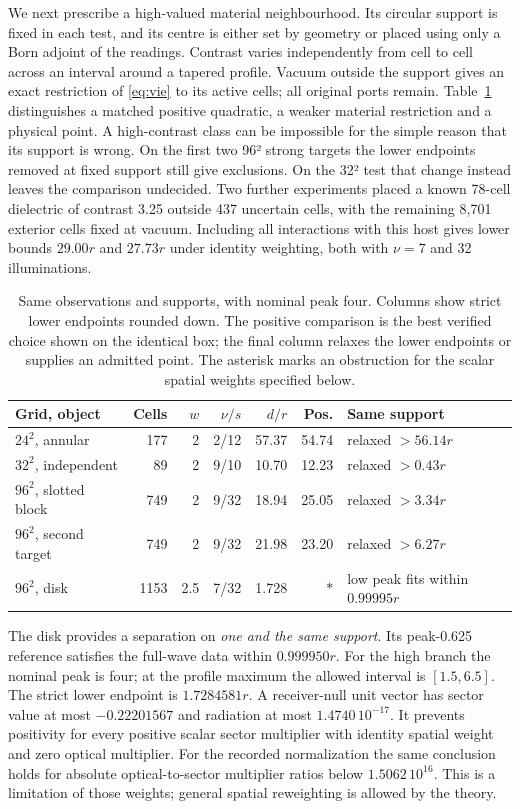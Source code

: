 We next prescribe a high-valued material neighbourhood. Its circular support is fixed in each test, and its centre is either set by geometry or placed using only a Born adjoint of the readings. Contrast varies independently from cell to cell across an interval around a tapered profile. Vacuum outside the support gives an exact restriction of \eqref{eq:vie} to its active cells; all original ports remain. Table~\ref{tab:native} distinguishes a matched positive quadratic, a weaker material restriction and a physical point. A high-contrast class can be impossible for the simple reason that its support is wrong. On the first two 96² strong targets the lower endpoints removed at fixed support still give exclusions. On the 32² test that change instead leaves the comparison undecided. Two further experiments placed a known 78-cell dielectric of contrast 3.25 outside 437 uncertain cells, with the remaining 8,701 exterior cells fixed at vacuum. Including all interactions with this host gives lower bounds $29.00r$ and $27.73r$ under identity weighting, both with $\nu=7$ and 32 illuminations.

\begin{table}[!htbp]\centering\small
\caption{Same observations and supports, with nominal peak four. Columns show strict lower endpoints rounded down. The positive comparison is the best verified choice shown on the identical box; the final column relaxes the lower endpoints or supplies an admitted point. The asterisk marks an obstruction for the scalar spatial weights specified below.}\label{tab:native}
\begin{tabular}{lrrrrrp{.23\linewidth}}\toprule
Grid, object & Cells & $w$ & $\nu/s$ & $d/r$ & Pos. & Same support\\\midrule
$24^2$, annular & 177 & 2 & 2/12 & 57.37 & 54.74 & relaxed $>56.14r$\\
$32^2$, independent & 89 & 2 & 9/10 & 10.70 & 12.23 & relaxed $>0.43r$\\
$96^2$, slotted block & 749 & 2 & 9/32 & 18.94 & 25.05 & relaxed $>3.34r$\\
$96^2$, second target & 749 & 2 & 9/32 & 21.98 & 23.20 & relaxed $>6.27r$\\
$96^2$, disk & 1153 & 2.5 & 7/32 & 1.728 & $*$ & low peak fits within $0.99995r$\\\bottomrule
\end{tabular}
\end{table}

The disk provides a separation on \emph{one and the same support}. Its peak-0.625 reference satisfies the full-wave data within $0.999950r$. For the high branch the nominal peak is four; at the profile maximum the allowed interval is $[1.5,6.5]$. The strict lower endpoint is $1.7284581r$. A receiver-null unit vector has sector value at most $-0.22201567$ and radiation at most $1.4740\,10^{-17}$. It prevents positivity for every positive scalar sector multiplier with identity spatial weight and zero optical multiplier. For the recorded normalization the same conclusion holds for absolute optical-to-sector multiplier ratios below $1.5062\,10^{16}$. This is a limitation of those weights; general spatial reweighting is allowed by the theory.

